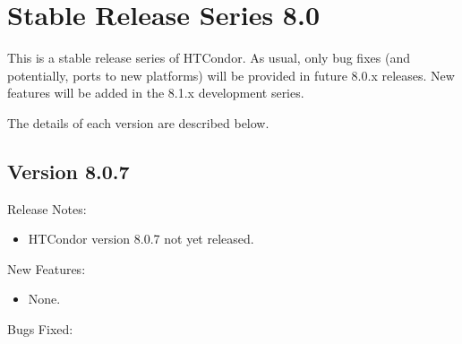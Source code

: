 
\section{\label{sec:History-8-0}Stable Release Series 8.0}

This is a stable release series of HTCondor.
As usual, only bug fixes (and potentially, ports to new platforms)
will be provided in future 8.0.x releases.
New features will be added in the 8.1.x development series.

The details of each version are described below.

\subsection*{\label{sec:New-8-0-7}Version 8.0.7}

\noindent Release Notes:

\begin{itemize}

\item HTCondor version 8.0.7 not yet released.

\end{itemize}


\noindent New Features:

\begin{itemize}

\item None.

\end{itemize}

\noindent Bugs Fixed:

